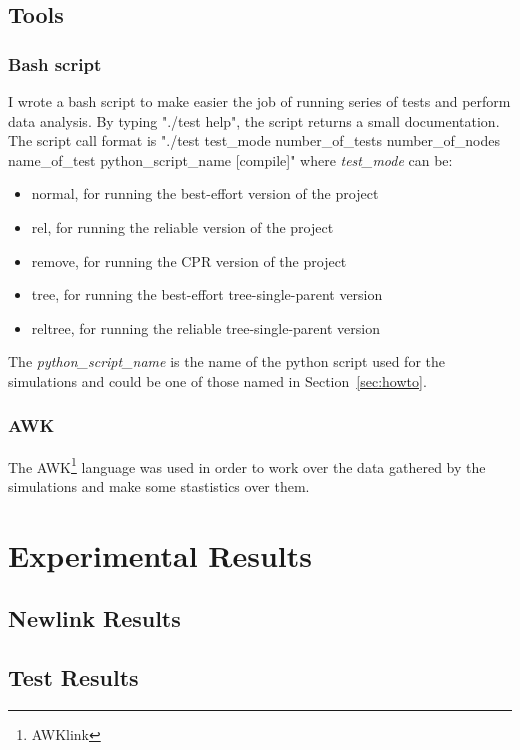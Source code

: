\documentclass{article}
\begin{document}
\subsection{Tools}
\subsubsection{Bash script}
\label{sec:bash}
I wrote a bash script to make easier the job of running series of tests and perform data analysis. By typing "./test help", the script returns a small documentation. The script call format is "./test test\_mode number\_of\_tests number\_of\_nodes name\_of\_test python\_script\_name [compile]" where \textit{test\_mode} can be:
\begin{itemize}
	\item normal, for running the best-effort version of the project
	\item rel, for running the reliable version of the project
	\item remove, for running the CPR version of the project
	\item tree, for running the best-effort tree-single-parent version
	\item reltree, for running the reliable tree-single-parent version
\end{itemize}
The \textit{python\_script\_name} is the name of the python script used for the simulations and could be one of those named in Section~\ref{sec:howto}.
\subsubsection{AWK}
The AWK\footnote{AWKlink} language was used in order to work over the data gathered by the simulations and make some stastistics over them.
\clearpage

\section{Experimental Results}
\subsection{Newlink Results}
\subsection{Test Results}
\end{document}
